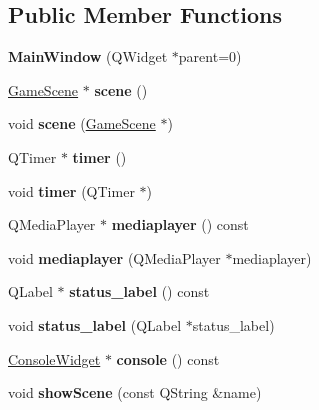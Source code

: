 \subsection*{Public Member Functions}
\begin{DoxyCompactItemize}
\item 
\mbox{\label{class_main_window_a8b244be8b7b7db1b08de2a2acb9409db}} 
{\bfseries Main\+Window} (Q\+Widget $\ast$parent=0)
\item 
\mbox{\label{class_main_window_a8876be87b41337f2ccf8ef1fc6b4a9c8}} 
\hyperlink{class_game_scene}{Game\+Scene} $\ast$ {\bfseries scene} ()
\item 
\mbox{\label{class_main_window_a0eae38634f26f1bd23717174cd751523}} 
void {\bfseries scene} (\hyperlink{class_game_scene}{Game\+Scene} $\ast$)
\item 
\mbox{\label{class_main_window_ae9adbd9ad74d836628ff2950d503e397}} 
Q\+Timer $\ast$ {\bfseries timer} ()
\item 
\mbox{\label{class_main_window_a5ac9feeab611a5aafaa0191df82b4bf1}} 
void {\bfseries timer} (Q\+Timer $\ast$)
\item 
\mbox{\label{class_main_window_a6a897bf339db50a6209d6935b039f1a7}} 
Q\+Media\+Player $\ast$ {\bfseries mediaplayer} () const
\item 
\mbox{\label{class_main_window_aec13aad03609daadb5e54e2de86f1e08}} 
void {\bfseries mediaplayer} (Q\+Media\+Player $\ast$mediaplayer)
\item 
\mbox{\label{class_main_window_adb747cc217a5a2a077af79fe72c278cf}} 
Q\+Label $\ast$ {\bfseries status\+\_\+label} () const
\item 
\mbox{\label{class_main_window_a685d2e26a50d151d9ebd4fb0cc9f8aca}} 
void {\bfseries status\+\_\+label} (Q\+Label $\ast$status\+\_\+label)
\item 
\mbox{\label{class_main_window_a5f010205227b4aaf83f3874d5fbb08a0}} 
\hyperlink{class_console_widget}{Console\+Widget} $\ast$ {\bfseries console} () const
\item 
\mbox{\label{class_main_window_a1fabca5cc1f1f4f6a4a1cecec17aa822}} 
void {\bfseries show\+Scene} (const Q\+String \&name)
\end{DoxyCompactItemize}
